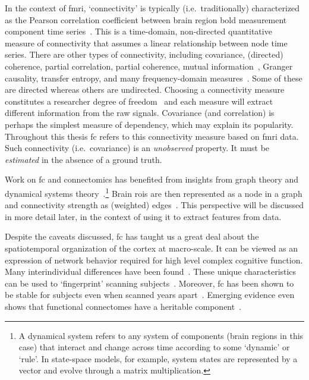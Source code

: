 In the context of \gls{fmri}, `connectivity' is typically (i.e.~traditionally) characterized as the Pearson correlation coefficient between brain region \gls{bold} measurement component time series~\parencite{Zalesky2012}.
This is a time-domain, non-directed quantitative measure of connectivity that assumes a linear relationship between node time series.
There are other types of connectivity, including covariance, (directed) coherence, partial correlation, partial coherence, mutual information~\parencite[see e.g.][chapter 2]{Cover2005}, Granger causality, transfer entropy, and many frequency-domain measures~\parencite[see][for reviews]{Wang2014, VanDiessen2015, Bastos2016, Foti2019}.
Some of these are directed whereas others are undirected.
Choosing a connectivity measure constitutes a researcher degree of freedom~\parencite{Gelman2013} and each measure will extract different information from the raw signals.
%
Covariance (and correlation) is perhaps the simplest measure of dependency, which may explain its popularity.
Throughout this thesis \gls{fc} refers to this connectivity measure based on \gls{fmri} data.
Such connectivity (i.e.~covariance) is an \emph{unobserved} property.
It must be \emph{estimated} in the absence of a ground truth.

Work on \gls{fc} and connectomics has benefited from insights from graph theory and dynamical systems theory~\parencite{Bassett2017, Betzel2022}.\footnote{A dynamical system refers to any system of components (brain regions in this case) that interact and change across time according to some `dynamic' or `rule'. In state-space models, for example, system states are represented by a vector and evolve through a matrix multiplication.}
Brain \glspl{roi} are then represented as a node in a graph and connectivity strength as (weighted) edges~\parencite[i.e.~node-pairs, see also][]{Ryyppo2018}.
This perspective will be discussed in more detail later, in the context of using it to extract features from data.

Despite the caveats discussed, \gls{fc} has taught us a great deal about the spatiotemporal organization of the cortex at macro-scale.
It can be viewed as an expression of network behavior required for high level complex cognitive function.
%
Many interindividual differences have been found~\parencite{Liegeois2019}.
These unique characteristics can be used to `fingerprint' scanning subjects~\parencite{Finn2015}.
Moreover, \gls{fc} has been shown to be stable for subjects even when scanned years apart~\parencite{Guo2012}.
Emerging evidence even shows that functional connectomes have a heritable component~\parencite{Jun2022}.
